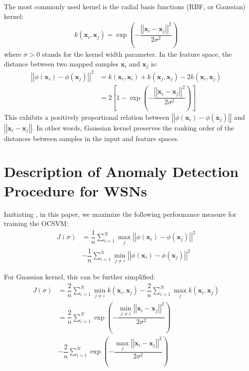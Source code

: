 \documentclass[conference]{IEEEtran}
\begin{document}
The most commonly used kernel is the radial basis functions (RBF, or Gaussian) kernel:
\begin{align}
k \left( \mathbf{x}_i, \mathbf{x}_j\right) = \exp \left( - \dfrac{\left|\left| \mathbf{x}_i - \mathbf{x}_j \right|\right|^2}{2 \sigma^2} \right)
\end{align}
where $\sigma > 0$ stands for the kernel width parameter. In the feature space, the distance between two mapped samples $\mathbf{x}_i$ and $\mathbf{x}_j$ is:
\begin{align}
\left|\left| \phi \left( \mathbf{x}_i \right) - \phi \left( \mathbf{x}_j \right) \right|\right|^2 &= k \left( \mathbf{x}_i, \mathbf{x}_i\right) + k \left( \mathbf{x}_j, \mathbf{x}_j\right) - 2 k \left( \mathbf{x}_i, \mathbf{x}_j\right) \nonumber \\
&= 2 \left[ 1 -  \exp \left( - \dfrac{\left|\left| \mathbf{x}_i - \mathbf{x}_j \right|\right|^2}{2 \sigma^2}  \right) \right]
\end{align}
This exhibits a positively proportional relation between $\left|\left| \phi \left( \mathbf{x}_i \right) - \phi \left( \mathbf{x}_j \right) \right|\right|$ and $\left|\left| \mathbf{x}_i - \mathbf{x}_j \right|\right|$. In other words, Gaussian kernel preserves the ranking order of the distances between samples in the input and feature spaces.

\section{Description of Anomaly Detection Procedure for WSNs}\label{sec:implementation}

Imitiating \cite{Xiao2014}, in this paper, we maximize the following performance measure for training the OCSVM:
\begin{align}
J (\sigma) &= \dfrac{1}{n} \sum _{i=1}^N \max_j \left|\left| \phi \left( \mathbf{x}_i \right) - \phi \left( \mathbf{x}_j \right) \right|\right|^2 \nonumber \\
&- \dfrac{1}{n} \sum _{i=1}^N \min_{j \ne i} \left|\left| \phi \left( \mathbf{x}_i \right) - \phi \left( \mathbf{x}_j \right) \right|\right|^2 
\end{align}

For Guassian kernel, this can be further simplified:
\begin{align}
J (\sigma) &= \dfrac{2}{n} \sum _{i=1}^N \min_{j \ne i}  k \left( \mathbf{x}_i, \mathbf{x}_j\right) - \dfrac{2}{n} \sum _{i=1}^N \max_{j}  k \left( \mathbf{x}_i, \mathbf{x}_j\right) \\
&=\dfrac{2}{n} \sum _{i=1}^N \exp \left( - \dfrac{\min_{j \ne i} \left|\left| \mathbf{x}_i - \mathbf{x}_j \right|\right|^2}{2 \sigma^2}  \right) \nonumber \\
&- \dfrac{2}{n} \sum _{i=1}^N \exp \left( - \dfrac{\max_j \left|\left| \mathbf{x}_i - \mathbf{x}_j \right|\right|^2}{2 \sigma^2}  \right) 
\end{align}
\end{document}

